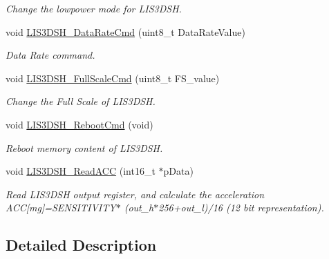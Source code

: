 \begin{DoxyCompactItemize}
\begin{DoxyCompactList}\small\item\em Change the lowpower mode for L\-I\-S3\-D\-S\-H. \end{DoxyCompactList}\item 
void \hyperlink{group__LIS3DSH__Private__Functions_gaae93269b63a9b48c433998121680ac81}{L\-I\-S3\-D\-S\-H\-\_\-\-Data\-Rate\-Cmd} (uint8\-\_\-t Data\-Rate\-Value)
\begin{DoxyCompactList}\small\item\em Data Rate command. \end{DoxyCompactList}\item 
void \hyperlink{group__LIS3DSH__Private__Functions_gadd43f8eeb1cf176968daea8b60f19224}{L\-I\-S3\-D\-S\-H\-\_\-\-Full\-Scale\-Cmd} (uint8\-\_\-t F\-S\-\_\-value)
\begin{DoxyCompactList}\small\item\em Change the Full Scale of L\-I\-S3\-D\-S\-H. \end{DoxyCompactList}\item 
void \hyperlink{group__LIS3DSH__Private__Functions_gaf404d817cf34093ac2cb46dcffcab4ed}{L\-I\-S3\-D\-S\-H\-\_\-\-Reboot\-Cmd} (void)
\begin{DoxyCompactList}\small\item\em Reboot memory content of L\-I\-S3\-D\-S\-H. \end{DoxyCompactList}\item 
void \hyperlink{group__LIS3DSH__Private__Functions_ga8e33fb97929654753950b3799ed9b5f5}{L\-I\-S3\-D\-S\-H\-\_\-\-Read\-A\-C\-C} (int16\-\_\-t $\ast$p\-Data)
\begin{DoxyCompactList}\small\item\em Read L\-I\-S3\-D\-S\-H output register, and calculate the acceleration A\-C\-C\mbox{[}mg\mbox{]}=S\-E\-N\-S\-I\-T\-I\-V\-I\-T\-Y$\ast$ (out\-\_\-h$\ast$256+out\-\_\-l)/16 (12 bit representation). \end{DoxyCompactList}\end{DoxyCompactItemize}


\subsection{Detailed Description}


